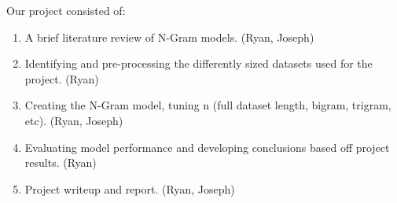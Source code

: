 \documentclass[11pt]{article}
\begin{document}
Our project consisted of:
\begin{enumerate}
    \item A brief literature review of N-Gram models. (Ryan, Joseph)
    \item Identifying and pre-processing the differently sized datasets used for the project. (Ryan)
    \item Creating the N-Gram model, tuning n (full dataset length, bigram, trigram, etc). (Ryan, Joseph)
    \item Evaluating model performance and developing conclusions based off project results. (Ryan)
    \item Project writeup and report. (Ryan, Joseph)
\end{enumerate}




\end{document}
